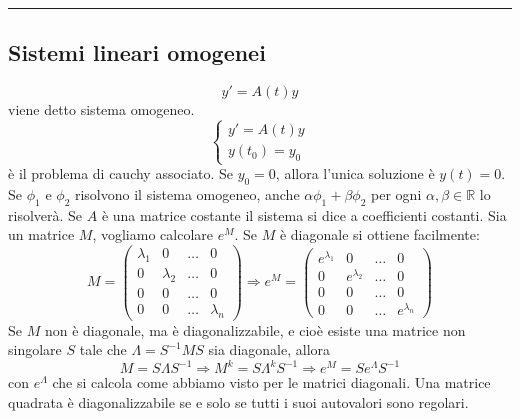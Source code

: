 \rule{\textwidth}{2pt}
\subsection{Sistemi lineari omogenei}
\[
    y' = A(t) y
\]
viene detto sistema omogeneo.\newline
\[
    \begin{cases}
        y' = A(t) y\\
        y(t_0) = y_0
    \end{cases}
\]
è il problema di cauchy associato.\newline
\newline
Se $y_0 = 0$, allora l'unica soluzione è $y(t) = 0$.\newline
\newline
Se $\phi_1$ e $\phi_2$ risolvono il sistema omogeneo, anche $\alpha \phi_1 + \beta \phi_2$ per ogni $\alpha, \beta \in \mathbb{R}$ lo risolverà.\newline
\newline
Se $A$ è una matrice costante il sistema si dice a coefficienti costanti.\newline
\newline
Sia un matrice $M$, vogliamo calcolare $e^{M}$. \newline
Se $M$ è diagonale si ottiene facilmente:
\[
    M = \left( \begin{matrix}
        \lambda_1  & 0 &\dots & 0\\
        0 & \lambda_2 &\dots &0\\
        0 & 0 &\dots &0\\
        0 & 0 &\dots &\lambda_n
    \end{matrix} \right) \Rightarrow e^M = \left( \begin{matrix}
        e^{\lambda_1}  & 0 &\dots & 0\\
        0 & e^{\lambda_2} &\dots &0\\
        0 & 0 &\dots &0\\
        0 & 0 &\dots & e^{\lambda_n}
    \end{matrix} \right)
\]
Se $M$ non è diagonale, ma è diagonalizzabile, e cioè esiste una matrice non singolare $S$ tale che $\Lambda = S^{-1}MS$ sia diagonale, allora
\[
    M = S\Lambda S^{-1} \Rightarrow  M^k = S\Lambda^kS^{-1} \Rightarrow e^M = S e^{\Lambda}S^{-1}
\]
con $e^{\Lambda}$ che si calcola come abbiamo visto per le matrici diagonali.\newline
\newline
Una matrice quadrata è diagonalizzabile se e solo se tutti i suoi autovalori sono regolari. \newline
